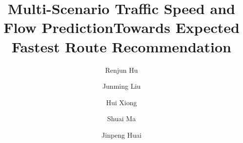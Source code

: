 \documentclass[acmlarge]{acmart}
\newcommand{\eat}[1]{}
\begin{document}
\title{Multi-Scenario Traffic Speed and Flow Prediction}

\title{Towards Expected Fastest Route Recommendation}


\author{Renjun Hu}
\author{Junming Liu}
\author{Hui Xiong}
\author{Shuai Ma}
\author{Jinpeng Huai}





\eat{   %
\author{
Renjun Hu$^{1,2}$, Junming Liu$^3$, Hui Xiong$^3$, Shuai Ma$^{1,2}$, Jinpeng Huai$^{1,2}$}
\affiliation{%
  \institution{$^1$ SKLSDE Lab, Beihang University, China}
  \institution{$^2$ Beijing Advanced Innovation Center for Big Data and Brain Computing, China}
  \institution{$^3$ Rutgers University, USA}
  \institution{\{hurenjun, mashuai, huaijp\}@buaa.edu.cn \hspace{12ex} \{jl1433, hxiong\}@rutgers.edu}
}
}%
\eat{
\author{Renjun Hu}
\affiliation{%
  \institution{SKLSDE Lab, Beihang University}
}
\email{hurenjun@buaa.edu.cn}
%
\author{Junming Liu}
\affiliation{%
  \institution{Rutgers University}
}
\email{jl1433@rutgers.edu}
%
\author{Hui Xiong}
\affiliation{%
  \institution{Rutgers University}
}
\email{hxiong@rutgers.edu}
%
\author{Jingjing Gu}
\affiliation{%
  \institution{Nanjing University of Aeronautics and Astronautics}
}
\email{gujj@nuaa.edu.cn}
%
\author{Shuai Ma}
\affiliation{%
  \institution{SKLSDE Lab, Beihang University}
}
\email{mashuai@buaa.edu.cn}
%
\author{Jinpeng Huai}
\affiliation{%
  \institution{SKLSDE Lab, Beihang University}
}
\email{huaijp@buaa.edu.cn}
}
\end{document}
